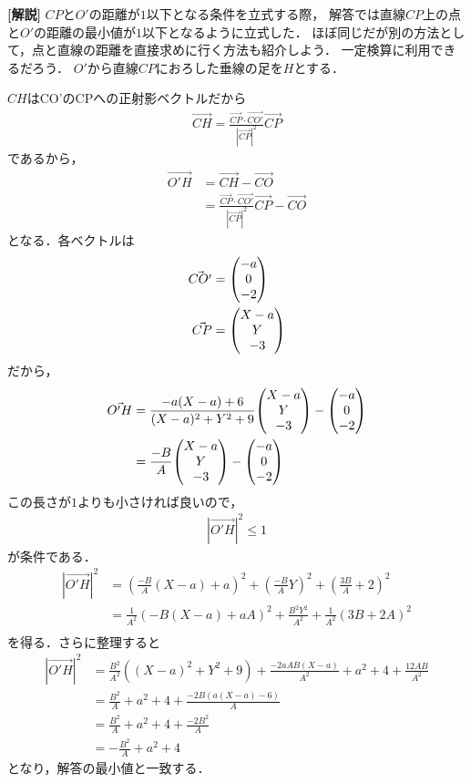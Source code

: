 \documentclass[a4paper,10pt]{ltjsarticle}
\begin{document}
\begin{multicols}{2}
  \vspace{10pt}
  {\bf[解説]}
  $CP$と$O'$の距離が$1$以下となる条件を立式する際，
  解答では直線$CP$上の点と$O'$の距離の最小値が$1$以下となるように立式した．
  ほぼ同じだが別の方法として，点と直線の距離を直接求めに行く方法も紹介しよう．
  一定検算に利用できるだろう．
  $O'$から直線$CP$におろした垂線の足を$H$とする．

  $CH$はCO'のCPへの正射影ベクトルだから
  \begin{align*}
    \vec{CH} = \frac{\vec{CP}\cdot\vec{CO'}}{|\vec{CP}|^2}\vec{CP}
  \end{align*}
  であるから，
  \begin{align*}
    \vec{O'H}
     & = \vec{CH}-\vec{CO}                                              \\
     & = \frac{\vec{CP}\cdot\vec{CO'}}{|\vec{CP}|^2}\vec{CP} - \vec{CO}
  \end{align*}
  となる．各ベクトルは
  \begin{align*}
    \vec{CO'} & = \mqty(-a  \\ 0 \\ -2)\\
    \vec{CP}  & = \mqty(X-a \\ Y \\ -3)
  \end{align*}
  だから，
  \begin{align*}
    \vec{O'H}
     & = \frac{-a(X-a)+6}{(X-a)^2+Y^2+9}\mqty(X-a \\ Y \\ -3) - \mqty(-a  \\ 0 \\ -2) \\
     & = \frac{-B}{A}\mqty(X-a                    \\ Y \\ -3) - \mqty(-a  \\ 0 \\ -2)
  \end{align*}
  この長さが$1$よりも小さければ良いので，
  \begin{align*}
    \left|\vec{O'H}\right|^2 \le 1
  \end{align*}
  が条件である．
  \begin{align*}
    \left|\vec{O'H}\right|^2
     & = \left(\frac{-B}{A}(X-a)+a\right)^2+\left(\frac{-B}{A}Y\right)^2 + \left(\frac{3B}{A}+2\right)^2 \\
     & = \frac{1}{A^2}\left(-B(X-a)+aA\right)^2+\frac{B^2Y^2}{A^2} + \frac{1}{A^2}\left(3B+2A\right)^2   \\
  \end{align*}
  を得る．さらに整理すると
  \begin{align*}
    \left|\vec{O'H}\right|^2
     & = \frac{B^2}{A^2}\left((X-a)^2+Y^2+9\right)
    + \frac{-2aAB(X-a)}{A^2} + a^2 + 4 + \frac{12AB}{A^2}  \\
     & = \frac{B^2}{A} + a^2 + 4 + \frac{-2B(a(X-a)-6)}{A} \\
     & = \frac{B^2}{A} + a^2 + 4 + \frac{-2B^2}{A}         \\
     & = -\frac{B^2}{A} + a^2 + 4
  \end{align*}
  となり，解答の最小値と一致する．


\end{multicols}
\end{document}
